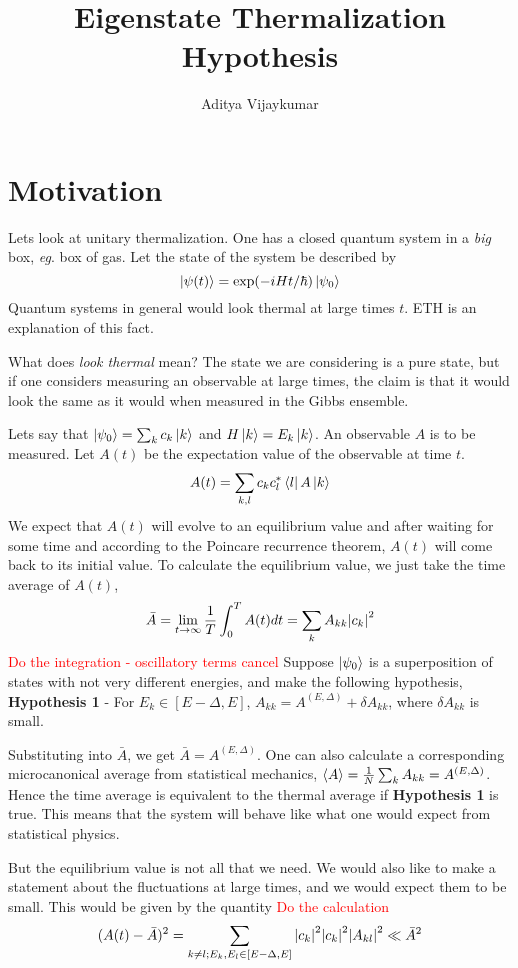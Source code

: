 \documentclass[a4paper,11pt]{article}
\title{\textbf{Eigenstate Thermalization Hypothesis}}
\author{Aditya Vijaykumar}
\affiliation{International Centre for Theoretical Sciences, Bengaluru, India.}
\begin{document}
\maketitle
\section{Motivation}
Lets look at unitary thermalization. One has a closed quantum system in a \textit{big} box, \textit{eg}. box of gas. Let the state of the system be described by 
$$\ket{\psi(t)} = \exp(-i H t/\hbar ) \ket{\psi_0}$$ Quantum systems in general would look thermal at large times $t$. ETH is an explanation of this fact.

What does \textit{look thermal} mean? The state we are considering is a pure state, but if one considers measuring an observable at large times, the claim is that it would look the same as it would when measured in the Gibbs ensemble.

Lets say that $\ket{\psi_0} = \sum_{k} c_k \ket{k}$ and $H\ket{k} = E_k \ket{k}$. An observable $A$ is to be measured. Let $A(t)$ be the expectation value of the observable at time $t$.
$$A(t)  = \sum_{k,l}c_k c_l^* \bra{l}A \ket{k}$$ We expect that $A(t)$ will evolve to an equilibrium value and after waiting for some time and according to the Poincare recurrence theorem, $A(t)$ will come back to its initial value. To calculate the equilibrium value, we just take the time average of $A(t)$,
$$\bar{A}=\lim\limits_{t \rightarrow \infty} \frac{1}{T}\int_{0}^{T} A(t) dt = \sum_{k} A_{kk}\abs{c_k}^2$$
\textcolor{red}{Do the integration - oscillatory terms cancel}
Suppose $\ket{\psi_0}$ is a superposition of states with not very different energies, and make the following hypothesis,\\
\textbf{Hypothesis 1} - For $E_k \in [E-\Delta, E]$, $A_{kk} = A^{(E,\Delta)} + \delta A_{kk}$, where $\delta A_{kk}$ is small.

Substituting into $\bar{A}$, we get $\bar{A} = A^{(E,\Delta)}$. One can also calculate a corresponding microcanonical average from statistical mechanics, $\expval{A} = \frac{1}{N}\sum_{k} A_{kk}= A^{(E,\Delta)}$. Hence the time average is equivalent to the thermal average if \textbf{Hypothesis 1} is true. This means that the system will behave like what one would expect from statistical physics. 

But the equilibrium value is not all that we need. We would also like to make a statement about the fluctuations at large times, and we would expect them to be small. This would be given by the quantity \textcolor{red}{Do the calculation}$$(A(t) - \bar{A})^2 = \sum_{k\ne l; E_k, E_l \in [E-\Delta,E]} \abs{c_k}^2 \abs{c_k}^2 \abs{A_{kl}}^2 \ll \bar{A}^2$$
\end{document}

